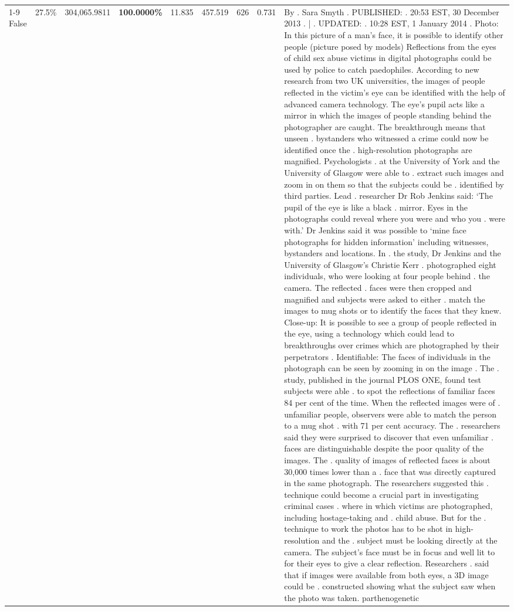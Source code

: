 \begin{table}[H]
\begin{tabular}{lllrlllll}
\cline{1-9}
False & 27.5\% & \color{red} 304,065.9811 & \bfseries \color{red} 100.0000\% & 11.835 & 457.519 & 626 & 0.731 & By . Sara Smyth . PUBLISHED: . 20:53 EST, 30 December 2013 . | . UPDATED: . 10:28 EST, 1 January 2014 . Photo: In this picture of a man's face, it is possible to identify other people (picture posed by models) Reflections from the eyes of child sex abuse victims in digital photographs could be used by police to catch paedophiles. According to new research from two UK universities, the images of people reflected in the victim's eye can be identified with the help of advanced camera technology. The eye's pupil acts like a mirror in which the images of people standing behind the photographer are caught. The breakthrough means that unseen . bystanders who witnessed a crime could now be identified once the . high-resolution photographs are magnified. Psychologists . at the University of York and the University of Glasgow were able to . extract such images and zoom in on them so that the subjects could be . identified by third parties. Lead . researcher Dr Rob Jenkins said: ‘The pupil of the eye is like a black . mirror. Eyes in the photographs could reveal where you were and who you . were with.' Dr Jenkins said it was possible to ‘mine face photographs for hidden information' including witnesses, bystanders and locations. In . the study, Dr Jenkins and the University of Glasgow's Christie Kerr . photographed eight individuals, who were looking at four people behind . the camera. The reflected . faces were then cropped and magnified and subjects were asked to either . match the images to mug shots or to identify the faces that they knew. Close-up: It is possible to see a group of people reflected in the eye, using a technology which could lead to breakthroughs over crimes which are photographed by their perpetrators . Identifiable: The faces of individuals in the photograph can be seen by zooming in on the image . The . study, published in the journal PLOS ONE, found test subjects were able . to spot the reflections of familiar faces 84 per cent of the time. When the reflected images were of . unfamiliar people, observers were able to match the person to a mug shot . with 71 per cent accuracy. The . researchers said they were surprised to discover that even unfamiliar . faces are distinguishable despite the poor quality of the images. The . quality of images of reflected faces is about 30,000 times lower than a . face that was directly captured in the same photograph. The researchers suggested this . technique could become a crucial part in investigating criminal cases . where in which victims are photographed, including hostage-taking and . child abuse. But for the . technique to work the photos has to be shot in high-resolution and the . subject must be looking directly at the camera. The subject's face must be in focus and well lit to for their eyes to give a clear reflection. Researchers . said that if images were available from both eyes, a 3D image could be . constructed showing what the subject saw when the photo was taken. parthenogenetic \\

\end{tabular}
\end{table}
